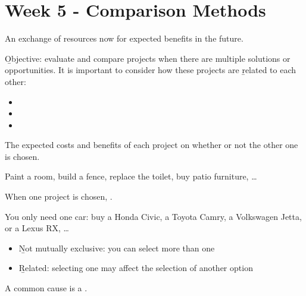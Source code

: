 
\section{Week 5 - Comparison Methods}


\begin{definition}
    An exchange of resources now for expected benefits in the future.
\end{definition}
\b{Objective}: evaluate and compare projects when there are multiple
solutions or opportunities. It is important to consider how these projects
are \b{related} to each other:
\begin{itemize}
    \item {}
    \item {}
    \item {}
\end{itemize}

\begin{definition}[Independent]
    The expected costs and benefits of each project  on
    whether or not the other one is chosen.
\end{definition}

\begin{example}
    Paint a room, build a fence, replace the toilet, buy patio furniture,
    \dots
    \\
\end{example}

\begin{definition}
    When one project is chosen, .
\end{definition}

\begin{example}
    You only need one car: buy a Honda Civic, a Toyota Camry, a Volkswagen
    Jetta, or a Lexus RX, \dots
    \\
\end{example}

\begin{definition}
    \begin{itemize}
        \item \b{Not mutually exclusive}: you can select more than one
        \item \b{Related}: selecting one may affect the selection of another option
    \end{itemize}
    A common cause is a .
\end{definition}

